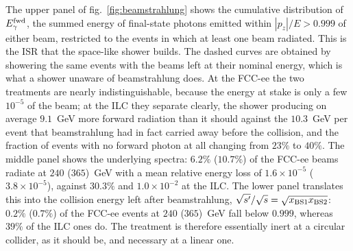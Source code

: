 The upper panel of fig.~\ref{fig:beamstrahlung} shows the cumulative
distribution of $E_\gamma^{\rm fwd}$, the summed energy of final-state
photons emitted within $|p_z|/E>0.999$ of either beam, restricted to the
events in which at least one beam radiated.  This is the ISR that the
space-like shower builds.  The dashed curves are obtained by showering the
same events with the beams left at their nominal energy, which is what a
shower unaware of beamstrahlung does.  At the FCC-ee the two treatments are
nearly indistinguishable, because the energy at stake is only
a few $10^{-5}$ of the beam; at the ILC they separate clearly, the
shower producing on average $9.1$~GeV more forward radiation than it should
against the $10.3$~GeV per event that beamstrahlung had in fact carried away
before the collision, and the fraction of events with no forward photon at
all changing from $23\%$ to $40\%$.  The middle panel shows the underlying
spectra: $6.2\%$ ($10.7\%$) of the FCC-ee beams radiate at $240$ ($365$)~GeV
with a mean relative energy loss of $1.6\times10^{-5}$ ($3.8\times10^{-5}$), against $30.3\%$ and
$1.0\times10^{-2}$ at the ILC.  The lower panel translates this into the
collision energy left after beamstrahlung,
$\sqrt{s'}/\sqrt{s}=\sqrt{x_{\rm BS1}x_{\rm BS2}}$: $0.2\%$ ($0.7\%$) of
the FCC-ee events at $240$ ($365$)~GeV fall below $0.999$, whereas $39\%$ of the ILC ones do.
The treatment is therefore essentially inert at a circular collider, as it
should be, and necessary at a linear one.


%
%
